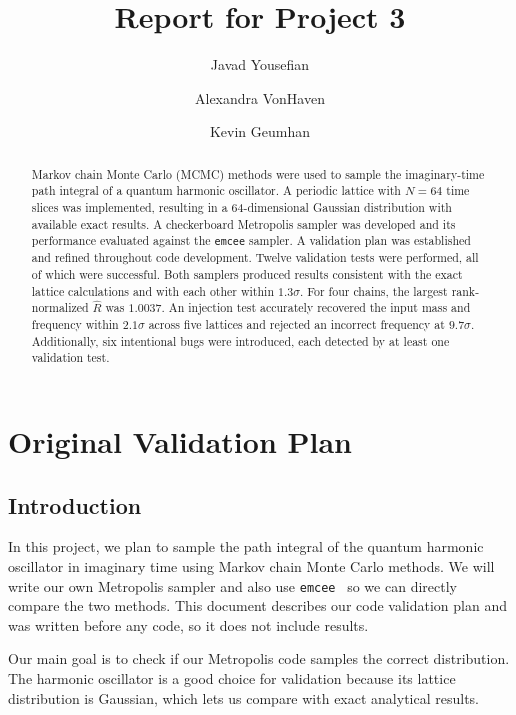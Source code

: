 \documentclass[11pt]{article}
\title{Report for Project 3}
\author[1]{Javad Yousefian}
\author[1]{Alexandra VonHaven}
\author[1]{Kevin Geumhan}
\affil[1]{Department of Physics, Syracuse University, Syracuse, New York 13244, USA}
\date{}
\begin{document}
\maketitle
\begin{abstract}
Markov chain Monte Carlo (MCMC) methods were used to sample the imaginary-time
path integral of a quantum harmonic oscillator. A periodic lattice with
$N = 64$ time slices was implemented, resulting in a 64-dimensional Gaussian
distribution with available exact results. A checkerboard Metropolis sampler
was developed and its performance evaluated against the \texttt{emcee} sampler.
A validation plan was established and refined throughout code development.
Twelve validation tests were performed, all of which were successful. Both
samplers produced results consistent with the exact lattice calculations and
with each other within $1.3\sigma$. For four chains, the largest
rank-normalized $\hat R$ was $1.0037$. An injection test accurately recovered
the input mass and frequency within $2.1\sigma$ across five lattices and
rejected an incorrect frequency at $9.7\sigma$. Additionally, six intentional
bugs were introduced, each detected by at least one validation test.
\end{abstract}

\section{Original Validation Plan}
\subsection{Introduction}
In this project, we plan to sample the path integral of the quantum harmonic oscillator in imaginary time using Markov chain Monte Carlo methods. We will write our own Metropolis sampler and also use \texttt{emcee}~\cite{emcee} so we can directly compare the two methods. This document describes our code validation plan and was written before any code, so it does not include results.

Our main goal is to check if our Metropolis code samples the correct distribution. The harmonic oscillator is a good choice for validation because its lattice distribution is Gaussian, which lets us compare with exact analytical results. 
\end{document}
